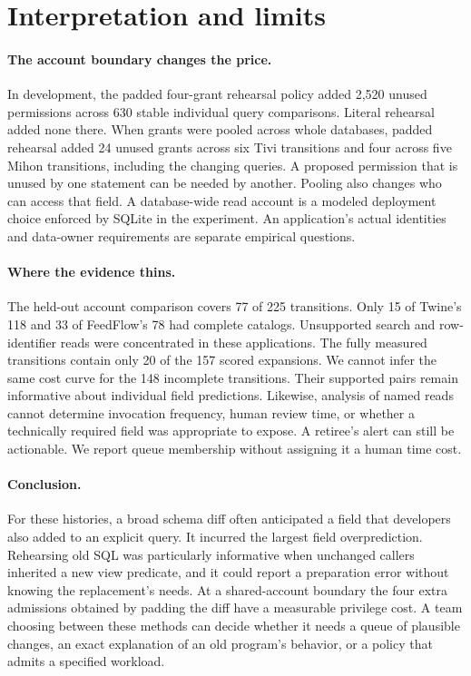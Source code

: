 \documentclass[11pt,a4paper]{article}
\begin{document}
\newpage
\section{Interpretation and limits}
\paragraph{The account boundary changes the price.} In development, the padded four-grant rehearsal policy added 2,520 unused permissions across 630 stable individual query comparisons. Literal rehearsal added none there. When grants were pooled across whole databases, padded rehearsal added 24 unused grants across six Tivi transitions and four across five Mihon transitions, including the changing queries. A proposed permission that is unused by one statement can be needed by another. Pooling also changes who can access that field. A database-wide read account is a modeled deployment choice enforced by SQLite in the experiment. An application's actual identities and data-owner requirements are separate empirical questions.

\paragraph{Where the evidence thins.} The held-out account comparison covers 77 of 225 transitions. Only 15 of Twine's 118 and 33 of FeedFlow's 78 had complete catalogs. Unsupported search and row-identifier reads were concentrated in these applications. The fully measured transitions contain only 20 of the 157 scored expansions. We cannot infer the same cost curve for the 148 incomplete transitions. Their supported pairs remain informative about individual field predictions. Likewise, analysis of named reads cannot determine invocation frequency, human review time, or whether a technically required field was appropriate to expose. A retiree's alert can still be actionable. We report queue membership without assigning it a human time cost.

\paragraph{Conclusion.} For these histories, a broad schema diff often anticipated a field that developers also added to an explicit query. It incurred the largest field overprediction. Rehearsing old SQL was particularly informative when unchanged callers inherited a new view predicate, and it could report a preparation error without knowing the replacement's needs. At a shared-account boundary the four extra admissions obtained by padding the diff have a measurable privilege cost. A team choosing between these methods can decide whether it needs a queue of plausible changes, an exact explanation of an old program's behavior, or a policy that admits a specified workload.
\end{document}
